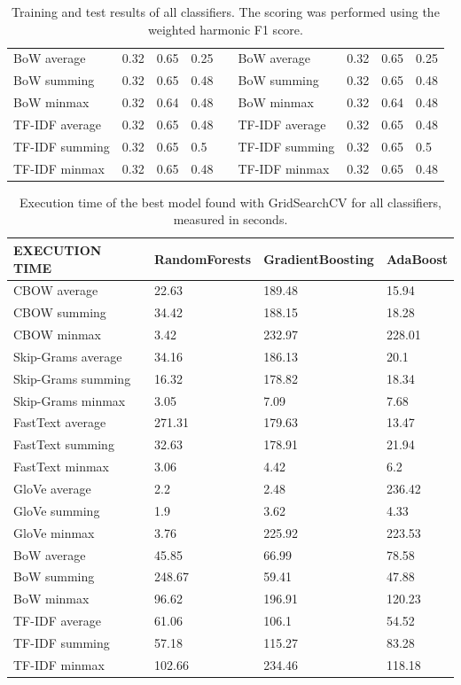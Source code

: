 \begin{table}[]
{\begin{tabular}{|l|lll|l|l|lll|}
BoW average & 0.32 & 0.65 & 0.25 &  & BoW average & 0.32 & 0.65 & 0.25 \\
BoW summing & 0.32 & 0.65 & 0.48 &  & BoW summing & 0.32 & 0.65 & 0.48 \\
BoW minmax & 0.32 & 0.64 & 0.48 &  & BoW minmax & 0.32 & 0.64 & 0.48 \\ \cline{1-4} \cline{6-9} 
TF-IDF average & 0.32 & 0.65 & 0.48 &  & TF-IDF average & 0.32 & 0.65 & 0.48 \\
TF-IDF summing & 0.32 & 0.65 & 0.5 &  & TF-IDF summing & 0.32 & 0.65 & 0.5 \\
TF-IDF minmax & 0.32 & 0.65 & 0.48 &  & TF-IDF minmax & 0.32 & 0.65 & 0.48 \\ \cline{1-4} \cline{6-9} 
\end{tabular}%
}
\caption{Training and test results of all classifiers. The scoring was performed using the weighted harmonic F1 score.}
\label{table:score}
\end{table}

\begin{table}[]
\centering
\begin{tabular}{|l|lll|}
\hline
\textbf{EXECUTION TIME} & RandomForests & GradientBoosting & AdaBoost \\ \hline
CBOW average & 22.63 & 189.48 & 15.94 \\
CBOW summing & 34.42 & 188.15 & 18.28 \\
CBOW minmax & 3.42 & 232.97 & 228.01 \\ \hline
Skip-Grams average & 34.16 & 186.13 & 20.1 \\
Skip-Grams summing & 16.32 & 178.82 & 18.34 \\
Skip-Grams minmax & 3.05 & 7.09 & 7.68 \\ \hline
FastText average & 271.31 & 179.63 & 13.47 \\
FastText summing & 32.63 & 178.91 & 21.94 \\
FastText minmax & 3.06 & 4.42 & 6.2 \\ \hline
GloVe average & 2.2 & 2.48 & 236.42 \\
GloVe summing & 1.9 & 3.62 & 4.33 \\
GloVe minmax & 3.76 & 225.92 & 223.53 \\ \hline
BoW average & 45.85 & 66.99 & 78.58 \\
BoW summing & 248.67 & 59.41 & 47.88 \\
BoW minmax & 96.62 & 196.91 & 120.23 \\ \hline
TF-IDF average & 61.06 & 106.1 & 54.52 \\
TF-IDF summing & 57.18 & 115.27 & 83.28 \\
TF-IDF minmax & 102.66 & 234.46 & 118.18 \\ \hline
\end{tabular}
\caption{Execution time of the best model found with GridSearchCV for all classifiers, measured in seconds.}
\label{table:execution_time}
\end{table}

